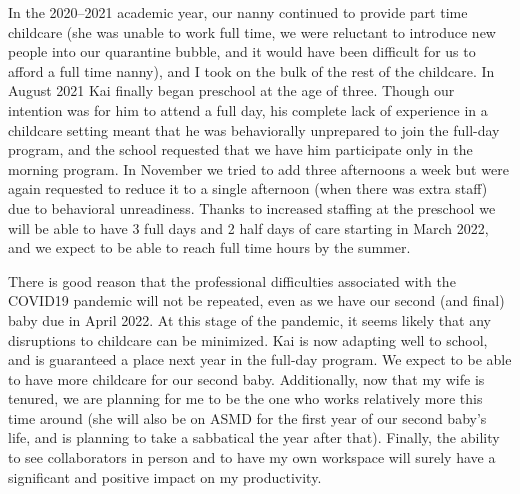 In the 2020–2021 academic year, our nanny continued to provide part time
childcare (she was unable to work full time, we were reluctant to introduce new
people into our quarantine bubble, and it would have been difficult for us to
afford a full time nanny), and I took on the bulk of the rest of the childcare.
In August 2021 Kai finally began preschool at the age of three. Though our
intention was for him to attend a full day, his complete lack of experience in a
childcare setting meant that he was behaviorally unprepared to join the full-day
program, and the school requested that we have him participate only in the
morning program. In November we tried to add three afternoons a week but were
again requested to reduce it to a single afternoon (when there was extra staff)
due to behavioral unreadiness. Thanks to increased staffing at the preschool we
will be able to have 3 full days and 2 half days of care starting in March 2022,
and we expect to be able to reach full time hours by the summer.

There is good reason that the professional difficulties associated with the
COVID19 pandemic will not be repeated, even as we have our second (and final)
baby due in April 2022. At this stage of the pandemic, it seems likely that any
disruptions to childcare can be minimized. Kai is now adapting well to school,
and is guaranteed a place next year in the full-day program.  We expect to be
able to have more childcare for our second baby. Additionally, now that my wife
is tenured, we are planning for me to be the one who works relatively more this
time around (she will also be on ASMD for the first year of our second baby’s
life, and is planning to take a sabbatical the year after that).  Finally, the
ability to see collaborators in person and to have my own workspace will surely
have a significant and positive impact on my productivity.




